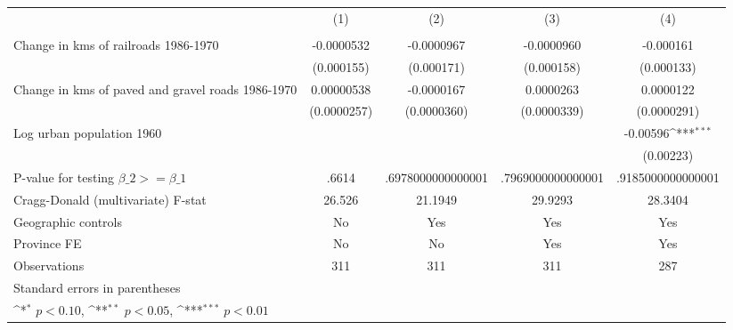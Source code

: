 {
\def\sym#1{\ifmmode^{#1}\else\(^{#1}\)\fi}
\begin{tabular}{l*{4}{c}}
\hline\hline
                &\multicolumn{1}{c}{(1)}&\multicolumn{1}{c}{(2)}&\multicolumn{1}{c}{(3)}&\multicolumn{1}{c}{(4)}\\
                &\multicolumn{1}{c}{}&\multicolumn{1}{c}{}&\multicolumn{1}{c}{}&\multicolumn{1}{c}{}\\
\hline
Change in kms of railroads 1986-1970&-0.0000532         &-0.0000967         &-0.0000960         &-0.000161         \\
                &(0.000155)         &(0.000171)         &(0.000158)         &(0.000133)         \\
[1em]
Change in kms of paved and gravel roads 1986-1970&0.00000538         &-0.0000167         &0.0000263         &0.0000122         \\
                &(0.0000257)         &(0.0000360)         &(0.0000339)         &(0.0000291)         \\
[1em]
Log urban population 1960&                  &                  &                  & -0.00596\sym{***}\\
                &                  &                  &                  &(0.00223)         \\
\hline
P-value for testing $\beta\_{2} >= \beta\_{1}$&    .6614         &.6978000000000001         &.7969000000000001         &.9185000000000001         \\
Cragg-Donald (multivariate) F-stat&   26.526         &  21.1949         &  29.9293         &  28.3404         \\
Geographic controls&       No         &      Yes         &      Yes         &      Yes         \\
Province FE     &       No         &       No         &      Yes         &      Yes         \\
Observations    &      311         &      311         &      311         &      287         \\
\hline\hline
\multicolumn{5}{l}{\footnotesize Standard errors in parentheses}\\
\multicolumn{5}{l}{\footnotesize \sym{*} \(p<0.10\), \sym{**} \(p<0.05\), \sym{***} \(p<0.01\)}\\
\end{tabular}
}
